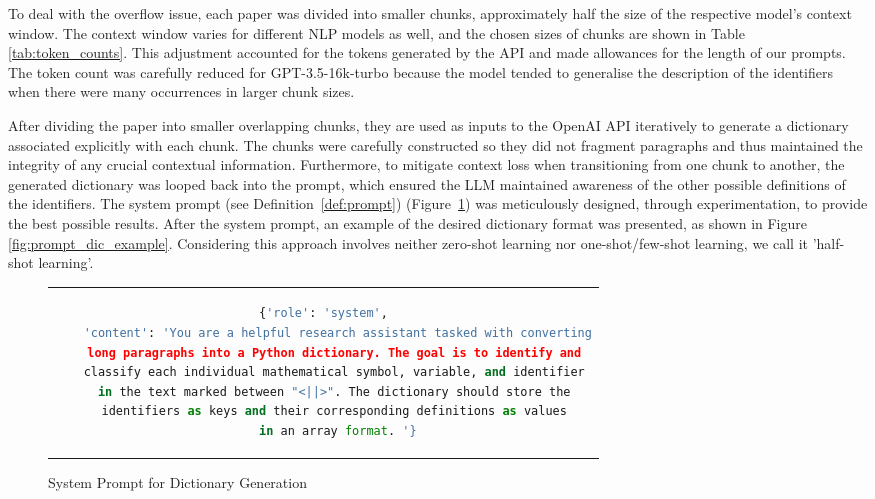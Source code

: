 To deal with the overflow issue, each paper was divided into smaller chunks, approximately half the size of the respective model's context window. The context window varies for different \ac{NLP} models as well, and the chosen sizes of chunks are shown in Table \ref{tab:token_counts}. This adjustment accounted for the tokens generated by the API and made allowances for the length of our prompts. The token count was carefully reduced for GPT-3.5-16k-turbo because the model tended to generalise the description of the identifiers when there were many occurrences in larger chunk sizes.

After dividing the paper into smaller overlapping chunks, they are used as inputs to the OpenAI API iteratively to generate a dictionary associated explicitly with each chunk. The chunks were carefully constructed so they did not fragment paragraphs and thus maintained the integrity of any crucial contextual information. Furthermore, to mitigate context loss when transitioning from one chunk to another, the generated dictionary was looped back into the prompt, which ensured the LLM maintained awareness of the other possible definitions of the identifiers. The system prompt (see Definition~\ref{def:prompt}) (Figure~\ref{fig:prompt_dic_system}) was meticulously designed, through experimentation, to provide the best possible results. After the system prompt, an example of the desired dictionary format was presented, as shown in Figure \ref{fig:prompt_dic_example}. Considering this approach involves neither zero-shot learning nor one-shot/few-shot learning, we call it  'half-shot learning'. 

\begin{figure}[htpb]
  \centering
  \begin{tabular}{c}
  \begin{lstlisting}[language=python]
    {'role': 'system',
    'content': 'You are a helpful research assistant tasked with converting
    long paragraphs into a Python dictionary. The goal is to identify and 
    classify each individual mathematical symbol, variable, and identifier 
    in the text marked between "<||>". The dictionary should store the 
    identifiers as keys and their corresponding definitions as values 
    in an array format. '}
  \end{lstlisting}
  \end{tabular}
  \caption[System Prompt for Dictionary Generation]{System Prompt for Dictionary Generation}\label{fig:prompt_dic_system}
\end{figure}

